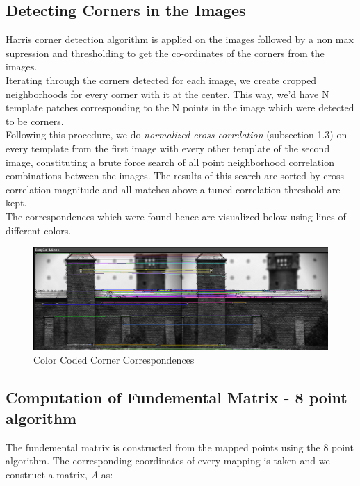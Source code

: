 \documentclass[letterpaper,11pt]{article}
\begin{document}
\subsection{Detecting Corners in the Images}
Harris corner detection algorithm is applied on the images followed by a non max
supression and thresholding to get the co-ordinates of the corners
from the images. \\

Iterating through the corners detected for each image, we create
cropped neighborhoods for every corner with it at the center.
This way, we'd have N template patches corresponding to the N points
in the image which were detected to be corners. \\

Following this procedure, we do \textit{normalized cross correlation}
(subsection 1.3) on every template from the first image with every
other template of the second image, constituting a brute force search
of all point neighborhood correlation combinations between the
images. The results of this search are sorted by cross correlation
magnitude and all matches above a tuned correlation threshold are
kept. \\

The correspondences which were found hence are visualized below using lines of different
colors.

\begin{figure}[h]
  \centering
  \includegraphics[width=\linewidth]{images/correspondences.png}
  \caption{Color Coded Corner Correspondences}
  \label{fig:sfig1}
\end{figure}

\subsection{Computation of Fundemental Matrix - 8 point algorithm}

The fundemental matrix is constructed from the mapped points using the 8 point algorithm.
The corresponding coordinates of every mapping is taken and we construct a matrix, \textit{A}
as: \\
\end{document}
